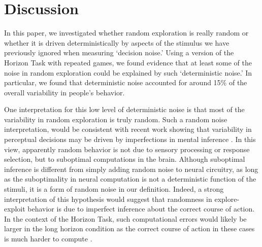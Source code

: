 \documentclass[12pt]{article}
\begin{document}
{\section*{Discussion}
In this paper, we investigated whether random exploration is really random or whether it is driven deterministically by aspects of the stimulus we have previously ignored when measuring `decision noise.'  Using a version of the Horizon Task with repeated games, we found evidence that at least some of the noise in random exploration could be explained by such `deterministic noise.' In particular, we found that deterministic noise accounted for around 15\% of the overall variability in people's behavior. 


One interpretation for this low level of deterministic noise is that most of the variability in random exploration is truly random. Such a random noise interpretation, would be consistent with recent work showing that variability in perceptual decisions may be driven by imperfections in mental inference \cite{drugowitsch16}. In this view, apparently random behavior is not due to sensory processing or response selection, but to suboptimal computations in the brain. Although suboptimal inference is different from simply adding random noise to neural circuitry\citep{Pouget12}, as long as the suboptimality in neural computation is not a deterministic function of the stimuli, it is a form of random noise in our definition. Indeed, a strong interpretation of this hypothesis would suggest that randomness in explore-exploit behavior is due to imperfect inference about the correct course of action. In the context of the Horizon Task, such computational errors would likely be larger in the long horizon condition as the correct course of action in these cases is much harder to compute \citep{Wilson2020}.

}
\end{document}
